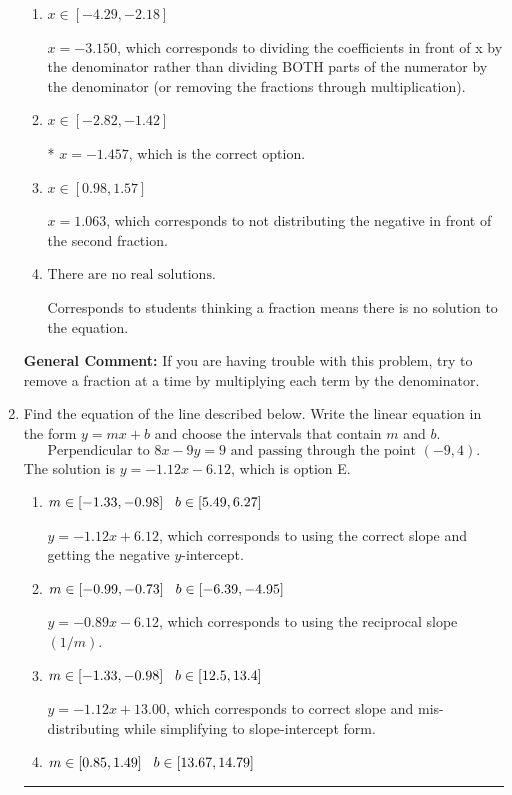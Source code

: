 \documentclass{extbook}[14pt]
\newcommand{\litem}[1]{\item #1

\rule{\textwidth}{0.4pt}}
\begin{document}
\begin{enumerate}
{\begin{enumerate}[label=\Alph*.]
 $x = -0.330$, which corresponds to dividing the second number in the numerator by the denominator rather than dividing BOTH parts of the numerator by the denominator (or removing the fractions through multiplication).
\item \( x \in [-4.29, -2.18] \)

 $x = -3.150$, which corresponds to dividing the coefficients in front of x by the denominator rather than dividing BOTH parts of the numerator by the denominator (or removing the fractions through multiplication).
\item \( x \in [-2.82, -1.42] \)

* $x = -1.457$, which is the correct option.
\item \( x \in [0.98, 1.57] \)

 $x = 1.063$, which corresponds to not distributing the negative in front of the second fraction.
\item \( \text{There are no real solutions.} \)

Corresponds to students thinking a fraction means there is no solution to the equation.
\end{enumerate}

\textbf{General Comment:} If you are having trouble with this problem, try to remove a fraction at a time by multiplying each term by the denominator.
}
\litem{
Find the equation of the line described below. Write the linear equation in the form $ y=mx+b $ and choose the intervals that contain $m$ and $b$.
\[ \text{Perpendicular to } 8 x - 9 y = 9 \text{ and passing through the point } (-9, 4). \]The solution is \( y = -1.12x - 6.12 \), which is option E.\begin{enumerate}[label=\Alph*.]
\item \( m \in [-1.33, -0.98] \hspace*{3mm} b \in [5.49, 6.27] \)

 $y = -1.12x + 6.12$, which corresponds to using the correct slope and getting the negative $y$-intercept.
\item \( m \in [-0.99, -0.73] \hspace*{3mm} b \in [-6.39, -4.95] \)

 $y = -0.89x - 6.12$, which corresponds to using the reciprocal slope $(1/m)$.
\item \( m \in [-1.33, -0.98] \hspace*{3mm} b \in [12.5, 13.4] \)

 $y = -1.12x + 13.00$, which corresponds to correct slope and mis-distributing while simplifying to slope-intercept form.
\item \( m \in [0.85, 1.49] \hspace*{3mm} b \in [13.67, 14.79] \)


\end{enumerate}}
\end{enumerate}
\end{document}
